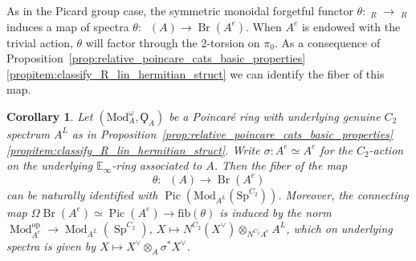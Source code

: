 \documentclass{article}
\DeclareMathOperator{\Br}{Br} %
\DeclareMathOperator{\Brp}{Br^p} %
\DeclareMathOperator{\Cat}{\mathcal{C}at} %
\DeclareMathOperator{\Catex}{\Cat_\infty^{ex}} %
\DeclareMathOperator{\Catp}{Cat^p_\infty} %
\DeclareMathOperator{\Mod}{Mod} %
\DeclareMathOperator{\Pic}{Pic} %
\DeclareMathOperator{\Spectra}{Sp} %
\newcommand{\EE}{\mathbb{E}}
\newcommand{\op}{\mathrm{op}} %
\newtheorem{corollary}[equation]{Corollary}
\theoremstyle{definition}
\begin{document}
As in the Picard group case, the symmetric monoidal forgetful functor $\theta \colon \Catp_{R} \to \Catex_R $ induces a map of spectra $ \theta \colon \Brp(A)\to \Br(A^e)$. 
When $ A^e $ is endowed with the trivial action, $ \theta $ will factor through the $2$-torsion on $\pi_0$. 
As a consequence of Proposition~\ref{prop:relative_poincare_cats_basic_properties}\ref{propitem:classify_R_lin_hermitian_struct} we can identify the fiber of this map.
\begin{corollary}\label{cor:Poincare_Brauer_to_Brauer_fiber}
Let $(\mathrm{Mod}_A^\omega, \Qoppa_A)$ be a Poincar{\'e} ring with underlying genuine $C_2$ spectrum $A^L$ as in Proposition~\ref{prop:relative_poincare_cats_basic_properties}\ref{propitem:classify_R_lin_hermitian_struct}. 
Write $ \sigma \colon A^e \simeq A^e $ for the $ C_2 $-action on the underlying $ \EE_\infty $-ring associated to $ A $. 
Then the fiber of the map \[\theta \colon \Brp(A)\to \Br(A^e)\] can be naturally identified with $ \Pic \left(\mathrm{Mod}_{A^L}\left(\mathrm{Sp}^{C_2}\right) \right)  $. 
Moreover, the connecting map $ \Omega \Br(A^e) \simeq \Pic(A^e) \to \mathrm{fib}(\theta) $ is induced by the norm $ \Mod_{A^e}^\op \to \Mod_{A^L}\left(\Spectra^{C_2}\right) $, $ X \mapsto N^{C_2} (X^\vee) \otimes_{N^{C_2}A^e} A^L $, which on underlying spectra is given by $ X \mapsto X^\vee \otimes_A \sigma^* X^\vee $. 
\end{corollary}
\end{document}

